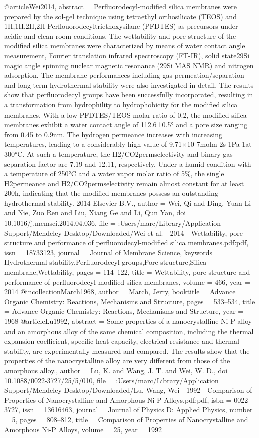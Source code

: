 @article{Wei2014,
abstract = {Perfluorodecyl-modified silica membranes were prepared by the sol-gel technique using tetraethyl orthosilicate (TEOS) and 1H,1H,2H,2H-Perflouorodecyltriethoxysilane (PFDTES) as precursors under acidic and clean room conditions. The wettability and pore structure of the modified silica membranes were characterized by means of water contact angle measurement, Fourier translation infrared spectroscopy (FT-IR), solid state29Si magic angle spinning nuclear magnetic resonance (29Si MAS NMR) and nitrogen adsorption. The membrane performances including gas permeation/separation and long-term hydrothermal stability were also investigated in detail. The results show that perfluorodecyl groups have been successfully incorporated, resulting in a transformation from hydrophility to hydrophobicity for the modified silica membranes. With a low PFDTES/TEOS molar ratio of 0.2, the modified silica membranes exhibit a water contact angle of 112.6±0.5° and a pore size ranging from 0.45 to 0.9nm. The hydrogen permeance increases with increasing temperatures, leading to a considerably high value of 9.71×10-7molm-2s-1Pa-1at 300°C. At such a temperature, the H2/CO2permselectivity and binary gas separation factor are 7.19 and 12.11, respectively. Under a humid condition with a temperature of 250°C and a water vapor molar ratio of 5{\%}, the single H2permeance and H2/CO2permselectivity remain almost constant for at least 200h, indicating that the modified membranes possess an outstanding hydrothermal stability. {\textcopyright} 2014 Elsevier B.V.},
author = {Wei, Qi and Ding, Yuan Li and Nie, Zuo Ren and Liu, Xiang Ge and Li, Qun Yan},
doi = {10.1016/j.memsci.2014.04.036},
file = {:Users/marc/Library/Application Support/Mendeley Desktop/Downloaded/Wei et al. - 2014 - Wettability, pore structure and performance of perfluorodecyl-modified silica membranes.pdf:pdf},
issn = {18733123},
journal = {Journal of Membrane Science},
keywords = {Hydrothermal stability,Perfluorodecyl groups,Pore structure,Silica membrane,Wettability},
pages = {114--122},
title = {{Wettability, pore structure and performance of perfluorodecyl-modified silica membranes}},
volume = {466},
year = {2014}
}
@incollection{March1968,
author = {March, Jerry},
booktitle = {Advance Organic Chemistry: Reactions, Mechanisms and Structure},
pages = {533--534},
title = {{Advance Organic Chemistry: Reactions, Mechanisms and Structure}},
year = {1968}
}
@article{Lu1992,
abstract = {Some properties of a nanocrystalline Ni-P alloy and an amorphous alloy of the same chemical composition, including the thermal expansion coefficient, specific heat capacity, electrical resistance and thermal stability, are experimentally measured and compared. The results show that the properties of the nanocrystalline alloy are very different from those of the amorphous alloy.},
author = {Lu, K. and Wang, J. T. and Wei, W. D.},
doi = {10.1088/0022-3727/25/5/010},
file = {:Users/marc/Library/Application Support/Mendeley Desktop/Downloaded/Lu, Wang, Wei - 1992 - Comparison of Properties of Nanocrystalline and Amorphous Ni-P Alloys.pdf:pdf},
isbn = {0022-3727},
issn = {13616463},
journal = {Journal of Physics D: Applied Physics},
number = {5},
pages = {808--812},
title = {{Comparison of Properties of Nanocrystalline and Amorphous Ni-P Alloys}},
volume = {25},
year = {1992}
}

